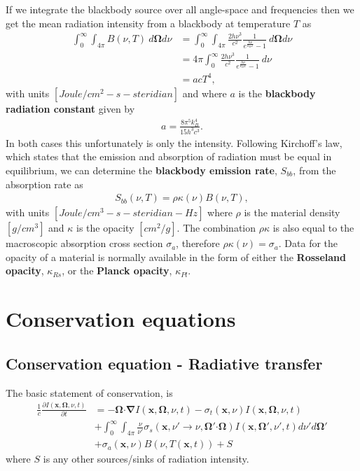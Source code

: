 \documentclass[10pt,letterpaper,notitlepage]{article}
\numberwithin{equation}{section}
\newcommand{\Omegabf}{\mathbf{\Omega}}
\newcommand{\bnabla}{\boldsymbol{\nabla}}
\newcommand{\position}{\mathbf{x}}
\newcommand{\dotp}{\boldsymbol{\cdot}}
\newcommand{\beqn}{\begin{equation}\begin{aligned}}
\newcommand{\eeqn}{\end{aligned}\end{equation}}
\begin{document}
If we integrate the blackbody source over all angle-space and frequencies then we get the mean radiation intensity from a blackbody at temperature $T$ as
\beqn 
\int_0^\infty \int_{4\pi}  B(\nu, T) \ d\Omegabf d\nu
&=\int_0^\infty \int_{4\pi}  \frac{2h\nu^3}{c^2} \frac{1}{e^{\frac{h\nu}{k_B T}} - 1  } \ d\Omegabf d\nu \\
&=4\pi \int_0^\infty \frac{2h\nu^3}{c^2} \frac{1}{e^{\frac{h\nu}{k_B T}} - 1  } \  d\nu \\
&= a c T^4,
\eeqn 
with units $[Joule/cm^2 {-} s {-} steridian]$ and where $a$ is the \textbf{blackbody radiation constant} given by
\beqn 
a = \frac{8\pi^5 k_B^4}{15 h^3 c^3}.
\eeqn 
\newline
\newline
In both cases this unfortunately is only the intensity. Following Kirchoff's law, which states that the emission and absorption of radiation must be equal in equilibrium, we can determine the \textbf{blackbody emission rate}, $S_{bb}$, from the absorption rate as
\beqn 
S_{bb}(\nu, T) = \rho \kappa(\nu) B(\nu, T),
\eeqn 
with units $[Joule/cm^3 {-} s {-} steridian {-} Hz]$
where $\rho$ is the material density $[g/cm^3]$ and $\kappa$ is the opacity $[cm^2/g]$. The combination $\rho \kappa$ is also equal to the macroscopic absorption cross section $\sigma_a$, therefore $\rho \kappa(\nu) = \sigma_a$. Data for the opacity of a material is normally available in the form of either the \textbf{Rosseland opacity}, $\kappa_{Rs}$, or the \textbf{Planck opacity}, $\kappa_{Pl}$.






\newpage
\section{Conservation equations}
\subsection{Conservation equation - Radiative transfer}
The basic statement of conservation, is
\beqn 
\frac{1}{c} \frac{\partial I(\position, \Omegabf, \nu, t)}{\partial t} &=
-\Omegabf \dotp \bnabla I(\position, \Omegabf, \nu, t)
- \sigma_t(\position,\nu) I(\position, \Omegabf, \nu, t) \\
&+ \int_0^{\infty} \int_{4\pi} \frac{\nu}{\nu'} \sigma_s(\position,\nu'{\to}\nu,\Omegabf'{\dotp}\Omegabf) I(\position, \Omegabf', \nu', t)  d\nu' d\Omegabf' \\
&+ \sigma_a(\position,\nu) B(\nu,T(\position, t))+S
\eeqn 
where $S$ is any other sources/sinks of radiation intensity. 
\end{document}
